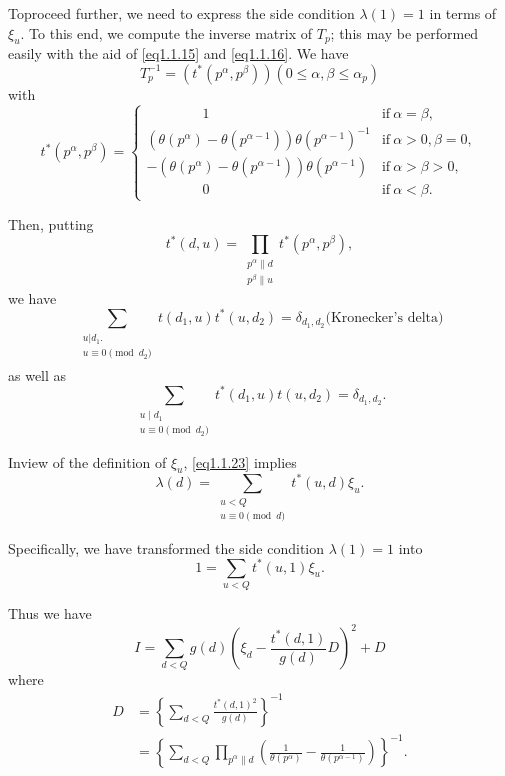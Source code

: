 To\pageoriginale proceed further, we need to express the side
condition $\lambda (1) 
= 1 $  in terms of  $ \xi_u$. To this end, we compute the inverse
matrix of $T_p$; this may be performed easily with  the aid of
\eqref{eq1.1.15} and  \eqref{eq1.1.16}. We have  
$$
T^{-1}_p = (t^* (p^\alpha, p^\beta)) (0 \leq \alpha,\beta \leq \alpha_p)
$$
with 
\begin{equation*}
  t^* (p^\alpha,p^\beta) =
  \begin{cases}
    \qquad \qquad 1 & \text{if}~ \alpha = \beta,\\
    ( \theta(p^\alpha)- \theta (p^{\alpha-1}))\theta (p^{\alpha-1})^{-1}
    & \text{if}~ \alpha > 0,\beta  = 0, \\ 
    -( \theta(p^\alpha)- \theta (p^{\alpha-1}))\theta (p^{\alpha-1}) 
    &\text{if}~ \alpha > \beta  > 0, \\ 
    \qquad \qquad 0 & \text{if}~ \alpha < \beta. 
  \end{cases} \tag{1.1.22}\label{eq1.1.22}
\end{equation*}

Then, putting
$$
t^* (d,u) = \prod_{\substack{p^\alpha \| d \\ p^\beta \| u}} t^*
(p^\alpha, p^\beta), 
$$
we have
\begin{equation*}
  \sum_{\substack{u | d_1. \\ u \equiv 0 \pmod{d_2} \\}} t(d_1,u)t^*
  (u,d_2) = \delta_{d_1, d_2} \text{(Kronecker's delta)}
  \tag{1.1.23} \label{eq1.1.23} 
\end{equation*}
as well as
\begin{equation*}
  \sum_{\substack{u \mid d_1 \\ u \equiv 0 \pmod{d_2}}} t^* (d_1,u)
  t(u,d_2) = \delta_{d_1, d_2}. \tag{1.1.24}\label{eq1.1.24} 
\end{equation*}

In\pageoriginale view of the definition of $\xi_u$,
\eqref{eq1.1.23} implies 
$$
\lambda(d)= \sum_{\substack{u<Q \\ u \equiv 0\pmod{d}}} t^{\ast}(u, d)\xi_u.
$$

Specifically, we have transformed the side condition $\lambda(1)=1$ into
$$
1=\sum_{u<Q}t^{*}(u,1)\xi_u. 
$$

Thus we have 
$$
I=\sum_{d<Q}g(d) \left(\xi_d - \frac{t^{*}(d,1)}{g(d)}D\right)^{2}+D
$$
where 
\begin{align*}
D&=\left\{\sum_{d<Q} \frac{t^{*}(d,1)^2}{g(d)}\right\}^{-1}\\ 
&=\left\{\sum_{d<Q}\prod_{p^{\alpha}\|d}(\frac{1}{\theta(p^{\alpha})} -
\frac{1}{\theta(p^{\alpha-1})})\right\}^{-1}.    
\end{align*}

